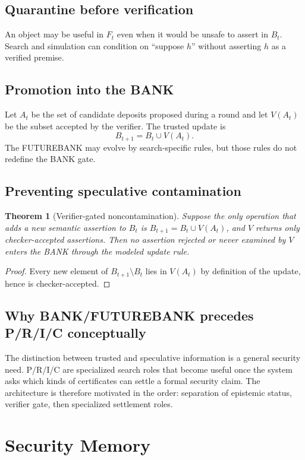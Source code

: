 \documentclass[11pt,oneside]{book}
\newtheorem{theorem}{Theorem}[chapter]
\theoremstyle{definition}
\theoremstyle{remark}
\begin{document}
\section{Quarantine before verification}
An object may be useful in $F_t$ even when it would be unsafe to assert in $B_t$. Search and simulation can condition on ``suppose $h$'' without asserting $h$ as a verified premise.

\section{Promotion into the BANK}
Let $A_t$ be the set of candidate deposits proposed during a round and let $V(A_t)$ be the subset accepted by the verifier. The trusted update is
\[
B_{t+1}=B_t\cup V(A_t).
\]
The FUTUREBANK may evolve by search-specific rules, but those rules do not redefine the BANK gate.

\section{Preventing speculative contamination}
\begin{theorem}[Verifier-gated noncontamination]
Suppose the only operation that adds a new semantic assertion to $B_t$ is $B_{t+1}=B_t\cup V(A_t)$, and $V$ returns only checker-accepted assertions. Then no assertion rejected or never examined by $V$ enters the BANK through the modeled update rule.
\end{theorem}

\begin{proof}
Every new element of $B_{t+1}\setminus B_t$ lies in $V(A_t)$ by definition of the update, hence is checker-accepted.
\end{proof}

\section{Why BANK/FUTUREBANK precedes P/R/I/C conceptually}
The distinction between trusted and speculative information is a general security need. P/R/I/C are specialized search roles that become useful once the system asks which kinds of certificates can settle a formal security claim. The architecture is therefore motivated in the order: separation of epistemic status, verifier gate, then specialized settlement roles.

\chapter{Security Memory}
\label{ch:security-memory}
\end{document}
